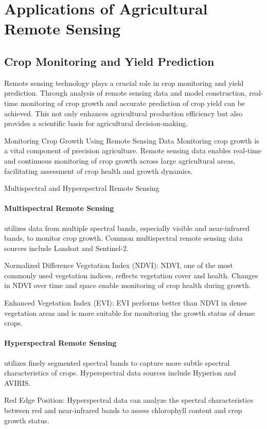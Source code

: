 \section{Applications of Agricultural Remote Sensing}

\subsection{Crop Monitoring and Yield Prediction}
Remote sensing technology plays a crucial role in crop monitoring and yield prediction. Through analysis of remote sensing data and model construction, real-time monitoring of crop growth and accurate prediction of crop yield can be achieved. This not only enhances agricultural production efficiency but also provides a scientific basis for agricultural decision-making.

Monitoring Crop Growth Using Remote Sensing Data
Monitoring crop growth is a vital component of precision agriculture. Remote sensing data enables real-time and continuous monitoring of crop growth across large agricultural areas, facilitating assessment of crop health and growth dynamics.

Multispectral and Hyperspectral Remote Sensing
\paragraph*{Multispectral Remote Sensing} utilizes data from multiple spectral bands, especially visible and near-infrared bands, to monitor crop growth. Common multispectral remote sensing data sources include Landsat and Sentinel-2.

Normalized Difference Vegetation Index (NDVI): NDVI, one of the most commonly used vegetation indices, reflects vegetation cover and health. Changes in NDVI over time and space enable monitoring of crop health during growth.

Enhanced Vegetation Index (EVI): EVI performs better than NDVI in dense vegetation areas and is more suitable for monitoring the growth status of dense crops.

\paragraph*{Hyperspectral Remote Sensing} utilizes finely segmented spectral bands to capture more subtle spectral characteristics of crops. Hyperspectral data sources include Hyperion and AVIRIS.

Red Edge Position: Hyperspectral data can analyze the spectral characteristics between red and near-infrared bands to assess chlorophyll content and crop growth status.

